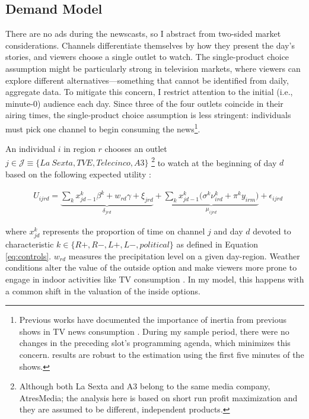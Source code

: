 \documentclass[12pt]{article}
\begin{document}
	\subsection{Demand Model}

There are no ads during the newscasts, so I abstract from two-sided market considerations. Channels differentiate themselves by how they present the day’s stories, and viewers choose a single outlet to watch. The single-product choice assumption might be particularly strong in television markets, where viewers can explore different alternatives—something that cannot be identified from daily, aggregate data. To mitigate this concern, I restrict attention to the initial (i.e., minute-0) audience each day. Since three of the four outlets coincide in their airing times, the single-product choice assumption is less stringent: individuals must pick one channel to begin consuming the news\footnote{Previous works have documented the importance of inertia from previous shows in TV news consumption \citep{richter2025structural}. During my sample period, there were no changes in the preceding slot's programming agenda, which minimizes this concern. results are robust to the estimation using the first five minutes of the shows. }.



	An individual $ i $  in region $r$ chooses an outlet $ j \in \mathcal{J}\equiv \{La \ Sexta,TVE,Telecinco,A3\}$ \footnote{Although both La Sexta and A3 belong to the same media company, AtresMedia; the analysis here is based on short run profit maximization and they are assumed to be different, independent products. } to watch at the beginning of day $d$ based on the following expected utility : 
	
	
	\begin{equation}\label{eq:utility}
		\begin{aligned}
			& U_{ijrd}= \underbrace{\sum_k x_{jd-1}^k\beta^k+w_{rd}   \gamma  +  \xi_{jrd}}_{\delta_{jrd}}  + \underbrace{  \sum_k x_{jd-1}^k \Big( \sigma^k \nu_{ird}^k  + \pi^ky_{irm} \Big)}_{\mu_{ijrd}}+\epsilon_{ijrd} 
		\end{aligned}
	\end{equation} 
	
	where $ x_{jd}^k $ represents the  proportion of time on channel $ j $ and day $ d$ devoted to characteristic $ k \in \{R+,R-,L+,L-,political\}$ as defined in Equation \ref{eq:controls}. $w_{rd}$ measures the precipitation level on a given day-region. Weather conditions alter the value of the outside option and make viewers more prone to engage in indoor activities like TV consumption \citep{wilbur}. In my model, this happens with a common shift in the valuation of the inside options. 
	
\end{document}
